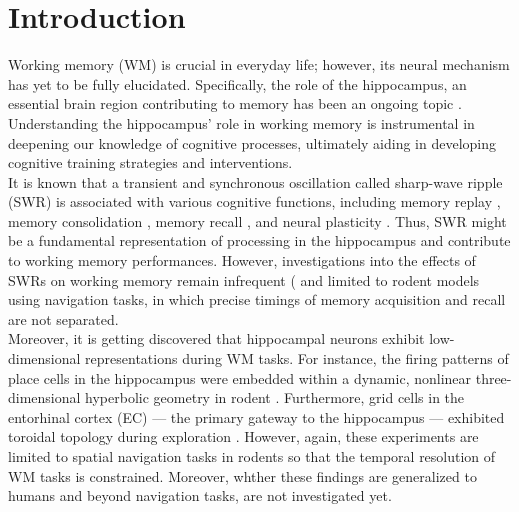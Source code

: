 \documentclass[final,3p,times,twocolumn]{elsarticle}
\begin{document}
\section{Introduction}
Working memory (WM) is crucial in everyday life; however, its neural mechanism has yet to be fully elucidated. Specifically, the role of the hippocampus, an essential brain region contributing to memory has been an ongoing topic \cite{scoville_loss_1957} \cite{squire_legacy_2009}  \cite{boran_persistent_2019} \cite{kaminski_persistently_2017} \cite{kornblith_persistent_2017} \cite{faraut_dataset_2018} \cite{borders_hippocampus_2022} \cite{li_functional_2023} \cite{dimakopoulos_information_2022}. Understanding the hippocampus' role in working memory is instrumental in deepening our knowledge of cognitive processes, ultimately aiding in developing cognitive training strategies and interventions.
\\
\indent
It is known that a transient and synchronous oscillation called sharp-wave ripple (SWR) \cite{buzsaki_hippocampal_2015} is associated with various cognitive functions, including memory replay \cite{wilson_reactivation_1994} \cite{nadasdy_replay_1999} \cite{lee_memory_2002} \cite{diba_forward_2007} \cite{davidson_hippocampal_2009}, memory consolidation \cite{girardeau_selective_2009} \cite{ego-stengel_disruption_2010} \cite{fernandez-ruiz_long-duration_2019} \cite{kim_corticalhippocampal_2022}, memory recall \cite{wu_hippocampal_2017} \cite{norman_hippocampal_2019} \cite{norman_hippocampal_2021}, and neural plasticity \cite{behrens_induction_2005} \cite{norimoto_hippocampal_2018}. Thus, SWR might be a fundamental representation of processing in the hippocampus and contribute to working memory performances. However, investigations into the effects of SWRs on working memory remain infrequent (\cite{jadhav_awake_2012} and limited to rodent models using navigation tasks, in which precise timings of memory acquisition and recall are not separated.
\\
\indent
Moreover, it is getting discovered that hippocampal neurons exhibit low-dimensional representations during WM tasks. For instance, the firing patterns of place cells \cite{okeefe_hippocampus_1971} \cite{okeefe_place_1976} \cite{ekstrom_cellular_2003} \cite{kjelstrup_finite_2008} \cite{harvey_intracellular_2009} in the hippocampus were embedded within a dynamic, nonlinear three-dimensional hyperbolic geometry in rodent \cite{zhang_hippocampal_2022}. Furthermore, grid cells in the entorhinal cortex (EC) --- the primary gateway to the hippocampus \cite{naber_reciprocal_2001} \cite{van_strien_anatomy_2009} \cite{strange_functional_2014} --- exhibited toroidal topology during exploration \cite{gardner_toroidal_2022}. However, again, these experiments are limited to spatial navigation tasks in rodents so that the temporal resolution of WM tasks is constrained. Moreover, whther these findings are generalized to humans and beyond navigation tasks, are not investigated yet.
\end{document}
